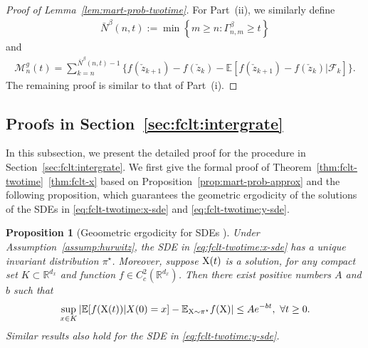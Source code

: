 \documentclass[11pt]{article}
\theoremstyle{plain}
\newtheorem{prop}{Proposition}[section]
\theoremstyle{definition}
\def\ermX{{\textnormal{X}}}
\def\MM{{\mathcal M}}
\def\FM{{\mathcal F}}
\def\RB{{\mathbb R}}
\def\EB{{\mathbb E}}
\newcommand{\zcheck}{{\check{z}}}
\newcommand{\xbar}{{\bar{\textnormal{X}}}}
\newcommand{\ssum}[3]{\sum\limits_{{#1}={#2}}^{#3}}
\begin{document}
\begin{appendix}
\begin{proof}[Proof of Lemma~\ref{lem:mart-prob-twotime}]
    For Part~(ii), we similarly define
    \begin{align*}
        \bar{N}^\beta(n, t) := \min \left\{ m \ge n \colon \Gamma^\beta_{n, m} \ge t \right\} 
    \end{align*}
    and
    \begin{align*}
        \MM_{n}^g(t) = \ssum{k}{n}{\bar{N}^\beta(n,t)-1} \big\{ f(\zcheck_{k+1}) - f(\zcheck_{k}) - \EB[ f(\zcheck_{k+1}) - f(\zcheck_{k}) | \FM_{k} ] \big\}.
    \end{align*}
    The remaining proof is similar to that of Part~(i).
\end{proof}

\subsection{Proofs in Section~\ref{sec:fclt:intergrate}}
\label{sec:fclt:proof:intergrate}
In this subsection, we present the detailed proof for the procedure in Section~\ref{sec:fclt:intergrate}. 
We first give the formal proof of Theorem~\ref{thm:fclt-twotime}~\ref{thm:fclt-x} based on Proposition~\ref{prop:mart-prob-approx} and the following proposition, which guarantees the geometric ergodicity of the solutions of the SDEs in \eqref{eq:fclt-twotime:x-sde} and \eqref{eq:fclt-twotime:y-sde}.

\begin{prop}[Geoometric ergodicity for SDEs {\cite[Theorem~4.4]{mattingly2002ergodicity}}]\label{prop:ergo}
    Under Assumption~\ref{assump:hurwitz}, the SDE in \eqref{eq:fclt-twotime:x-sde} has a unique invariant distribution $\pi^\star$. Moreover, suppose $\ermX(t)$ is a solution, for any compact set $K \subset \RB^{d_x}$ and function $f \in C_c^2(\RB^{d_x})$. Then there exist positive numbers $A$ and $b$ such that
    \begin{align*}
        \sup_{x \in K}  | \EB[ f(\ermX(t)) | X(0) = x ] - \EB_{\ermX \sim \pi^\star} f(\ermX)  | \le A e^{-bt}, \ \forall t \ge 0.
    \end{align*}
    Similar results also hold for the SDE in \eqref{eq:fclt-twotime:y-sde}.
\end{prop}



\end{appendix}
\end{document}
